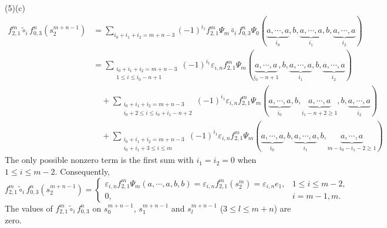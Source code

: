 \documentclass[10pt, reqno]{amsart}
\theoremstyle{definition}
\theoremstyle{remark}
\numberwithin{equation}{section}
\begin{document}
(5)(c)
\[\begin{aligned}
    f_{2,1}^m\tilde{\circ}_i f_{0,3}^n(s_2^{m+n-1}) &=\sum_{i_0+i_1+i_2=m+n-3}(-1)^{i_1} f_{2,1}^m\Psi_m \bar{\circ}_i f_{0,3}^n\Psi_0(\underbrace{a,\cdots,a}_{i_0},b,\underbrace{a,\cdots,a}_{i_1},b,\underbrace{a,\cdots,a}_{i_2})\\
    &=\sum_{\substack{i_0+i_1+i_2=m+n-3\\ 1\le i\le i_0-n+1}}(-1)^{i_1}\varepsilon_{i,n} f_{2,1}^m\Psi_m(\underbrace{a,\cdots,a}_{i_0-n+1},b,\underbrace{a,\cdots,a}_{i_1},b,\underbrace{a,\cdots,a}_{i_2})\\
     & \quad +\sum_{\substack{i_0+i_1+i_2=m+n-3\\ i_0+2\le i\le i_0+i_1-n+2}}(-1)^{i_1}\varepsilon_{i,n} f_{2,1}^m\Psi_m(\underbrace{a,\cdots,a}_{i_0},b,\underbrace{a,\cdots,a}_{i_1-n+2\ge 1},b,\underbrace{a,\cdots,a}_{i_2})\\
     & \quad +\sum_{\substack{i_0+i_1+i_2=m+n-3\\ i_0+i_1+3\le i\le m}}(-1)^{i_1}\varepsilon_{i,n} f_{2,1}^m\Psi_m(\underbrace{a,\cdots,a}_{i_0},b,\underbrace{a,\cdots,a}_{i_1},b,\underbrace{a,\cdots,a}_{m-i_0-i_1-2 \ge1})
\end{aligned}\]
The only possible nonzero term is the first sum with \(i_1=i_2=0\) when \(1\le i\le m-2\). Consequently,
\[     f_{2,1}^m\tilde{\circ}_i f_{0,3}^n(s_2^{m+n-1})=\begin{cases}
        \varepsilon_{i,n} f_{2,1}^m\Psi_m(a,\cdots,a,b,b)= \varepsilon_{i,n} f_{2,1}^m(s_2^m) = \varepsilon_{i,n} e_1, &1\le i\le m-2,\\
         0, & i=m-1,m.
     \end{cases}\]
The values of \(f_{2,1}^m \tilde{\circ}_i f_{0,3}^n\) on \(s_0^{m+n-1}\), \(s_1^{m+n-1}\) and \(s_l^{m+n-1}\) (\(3\le l \le m+n\)) are zero.
\end{document}
